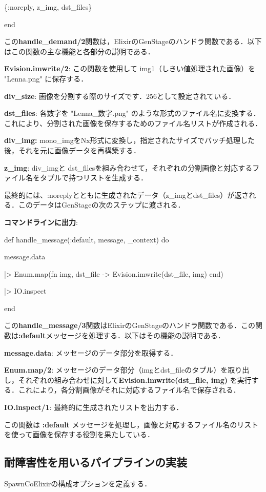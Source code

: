 \documentclass[a4paper]{jreport}	%
\begin{document}
    \{:noreply, z\_img, dst\_files\}
  
end

この\textbf{handle\_demand/2}関数は，ElixirのGenStageのハンドラ関数である．以下はこの関数の主な機能と各部分の説明である．

\textbf{Evision.imwrite/2}: この関数を使用して img1（しきい値処理された画像）を "Lenna.png" に保存する．

\textbf{div\_size}: 画像を分割する際のサイズです．256として設定されている．

\textbf{dst\_files}: 各数字を "Lenna\_数字.png" のような形式のファイル名に変換する．これにより、分割された画像を保存するためのファイル名リストが作成される．

\textbf{div\_img:} mono\_imgをNx形式に変換し，指定されたサイズでバッチ処理した後，それを元に画像データを再構築する．

\textbf{z\_img}: div\_imgと dst\_filesを組み合わせて，それぞれの分割画像と対応するファイル名をタプルで持つリストを生成する．

最終的には、:noreplyとともに生成されたデータ（z\_imgとdst\_files）が返される．このデータはGenStageの次のステップに渡される．

\textbf{コマンドラインに出力}:

  def handle\_message(:default, message, \_context) do
  
    message.data
    
    |> Enum.map(fn {img, dst\_file} -> Evision.imwrite(dst\_file, img) end)
    
    |> IO.inspect
    
  end

この\textbf{handle\_message/3}関数はElixirのGenStageのハンドラ関数である．この関数は\textbf{:default}メッセージを処理する．以下はその機能の説明である．

\textbf{message.data}: メッセージのデータ部分を取得する．

\textbf{Enum.map/2}: メッセージのデータ部分（imgとdst\_fileのタプル）を取り出し，それぞれの組み合わせに対して\textbf{Evision.imwrite(dst\_file, img)} を実行する．これにより，各分割画像がそれに対応するファイル名で保存される．

\textbf{IO.inspect/1}: 最終的に生成されたリストを出力する．

この関数は \textbf{:default} メッセージを処理し，画像と対応するファイル名のリストを使って画像を保存する役割を果たしている．

\subsection{耐障害性を用いるパイプラインの実装}
SpawnCoElixirの構成オプションを定義する．
\end{document}
